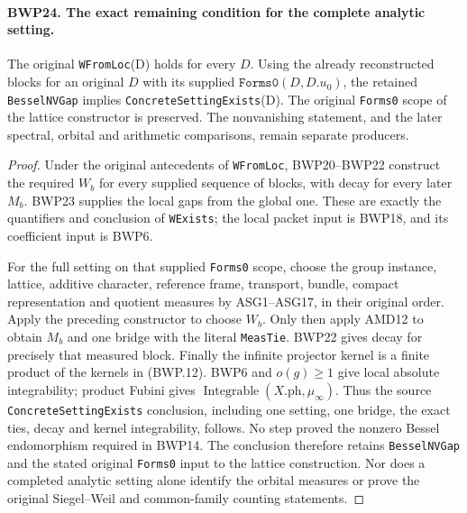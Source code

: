 \paragraph{BWP24. The exact remaining condition for the complete analytic setting.}
\label{claim:BWP24}
The original \texttt{WFromLoc}(D) holds for every \(D\).
Using the already reconstructed blocks for an original \(D\)
with its supplied \(\texttt{Forms0}(D,D.u_0)\), the retained
\texttt{BesselNVGap} implies
\texttt{ConcreteSettingExists}(D).  The original \texttt{Forms0}
scope of the lattice constructor is preserved.  The nonvanishing statement,
and the later spectral, orbital and arithmetic comparisons, remain
separate producers.

\begin{proof}
Under the original antecedents of \texttt{WFromLoc}, BWP20--BWP22
construct the required \(W_b\) for every supplied sequence of
blocks, with decay for every later \(M_b\).  BWP23 supplies the
local gaps from the global one.  These are exactly the quantifiers
and conclusion of \texttt{WExists}; the local packet input is
BWP18, and its coefficient input is BWP6.

For the full setting on that supplied \texttt{Forms0} scope,
choose the group instance, lattice, additive
character, reference frame, transport, bundle, compact representation
and quotient measures by ASG1--ASG17, in their original order.
Apply the preceding constructor to choose \(W_b\).  Only then
apply AMD12 to obtain \(M_b\) and one bridge with the literal
\texttt{MeasTie}.  BWP22 gives decay for precisely that measured
block.  Finally the infinite projector kernel is a finite product
of the kernels in (BWP.12).  BWP6 and \(o(g)\ge1\) give local
absolute integrability; product Fubini gives
\(\operatorname{Integrable}(X.\mathrm{ph},\mu_\infty)\).
Thus the source \texttt{ConcreteSettingExists} conclusion, including
one setting, one bridge, the exact ties, decay and kernel
integrability, follows.
No step proved the nonzero Bessel endomorphism required in BWP14.
The conclusion therefore retains \texttt{BesselNVGap} and the
stated original \texttt{Forms0} input to the lattice construction.
Nor does a completed analytic setting alone
identify the orbital measures or prove the original Siegel--Weil
and common-family counting statements.
\end{proof}
